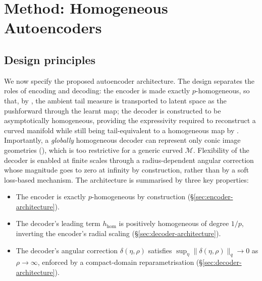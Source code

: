 \documentclass{article}
\theoremstyle{definition}
\newcommand{\cM}{\mathcal{M}}
\begin{document}
\section{Method: Homogeneous Autoencoders}
\label{sec:method}

\subsection{Design principles}
\label{sec:design-principles}

We now specify the proposed autoencoder architecture. The design separates the
roles of encoding and decoding: the encoder is made exactly \(p\)-homogeneous,
so that, by , the ambient
tail measure is transported to latent space as the pushforward through the
learnt map; the decoder is constructed to be asymptotically homogeneous,
providing the expressivity required to reconstruct a curved manifold while still
being tail-equivalent to a homogeneous map by
. Importantly, a \emph{globally}
homogeneous decoder can represent only conic image geometries
(), which is too restrictive for a
generic curved \(\cM\). Flexibility of the decoder is enabled at finite scales
through a radius-dependent angular correction whose magnitude goes to zero at
infinity by construction, rather than by a soft loss-based mechanism. The
architecture is summarised by three key properties:
\begin{itemize}
  \item The encoder is exactly \(p\)-homogeneous by construction
  (\S\ref{sec:encoder-architecture}).
  \item The decoder's leading term \(h_{\mathrm{hom}}\) is positively
  homogeneous of degree \(1/p\), inverting the encoder's radial scaling
  (\S\ref{sec:decoder-architecture}).
  \item The decoder's angular correction \(\delta(\eta,\rho)\) satisfies
  \(\sup_\eta \|\delta(\eta,\rho)\|_q\to0\) as \(\rho\to\infty\), enforced by a
  compact-domain reparametrisation
  (\S\ref{sec:decoder-architecture}).
\end{itemize}
\end{document}
